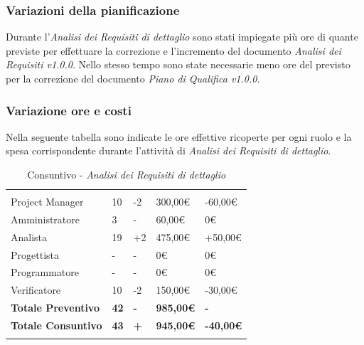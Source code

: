 \subsubsection{Variazioni della pianificazione}
Durante l'\textit{Analisi dei Requisiti di dettaglio} sono stati impiegate più ore di quante previste per effettuare la correzione e l'incremento del documento \textit{Analisi dei Requisiti v1.0.0}. Nello stesso tempo sono state necessarie meno ore del previsto per la correzione del documento \textit{Piano di Qualifica v1.0.0}.
\subsubsection{Variazione ore e costi}
Nella seguente tabella sono indicate le ore effettive ricoperte per ogni ruolo e la spesa corrispondente durante l'attività di \textit{Analisi dei Requisiti di dettaglio}.

\begin{table}[H]
	\centering
	\begin{tabular}{|p{3.8cm}|C{2.6cm}|C{2.9cm}|C{2.7cm}|C{3.3cm}|}
		
		 & & & & \\
		Project Manager  & 10 & -2 & 300,00\euro & -60,00\euro \\
		\hline
		Amministratore& 3 & - & 60,00\euro & 0\euro \\
		\hline
		Analista      & 19 & +2 & 475,00\euro & +50,00\euro \\
		\hline
		Progettista   & -  & - & 0\euro & 0\euro \\
		\hline
		Programmatore & -  & - & 0\euro & 0\euro \\
		\hline
		Verificatore  & 10 & -2 & 150,00\euro & -30,00\euro \\
		\textbf{Totale Preventivo} & \textbf{42} & \textbf{-} & \textbf{985,00\euro} & \textbf{-}\\
		\textbf{Totale Consuntivo} & \textbf{43} & \textbf{+} & \textbf{945,00\euro} & \textbf{-40,00\euro}\\
	\end{tabular}
	\caption{Consuntivo - \textit{Analisi dei Requisiti di dettaglio}}
	
\end{table}
